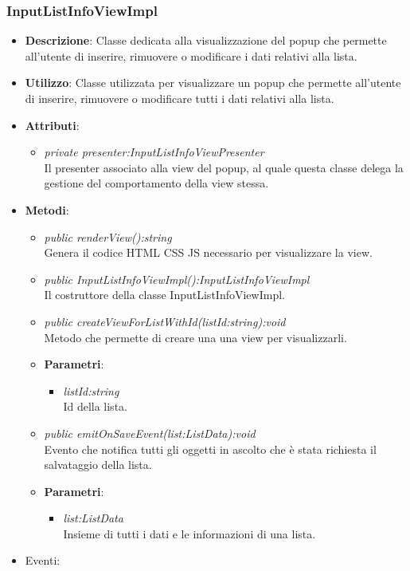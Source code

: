 \subsubsection{InputListInfoViewImpl}
\begin{itemize}
\item \textbf{Descrizione}: Classe dedicata alla visualizzazione del popup che permette all'utente di inserire, rimuovere o modificare i dati relativi alla lista.
\item \textbf{Utilizzo}: Classe utilizzata per visualizzare un popup che permette all'utente di inserire, rimuovere o modificare tutti i dati relativi alla lista.
\item \textbf{Attributi}: 
	\begin{itemize}
	\item \textit{private presenter:InputListInfoViewPresenter}\\
		Il presenter associato alla view del popup, al quale questa classe delega la gestione del comportamento della view stessa.
	\end{itemize}
\item \textbf{Metodi}:
	\begin{itemize}	
	\item \textit{public renderView():string}\\
			Genera il codice HTML CSS JS necessario per visualizzare la view.
	\item \textit{public InputListInfoViewImpl():InputListInfoViewImpl}\\
	Il costruttore della classe InputListInfoViewImpl.
	\item \textit{public createViewForListWithId(listId:string):void}\\
		Metodo che permette di creare una una view per visualizzarli.
			\item{\textbf{Parametri}: \begin{itemize}
			\item \textit{listId:string}\\
			Id della lista.
			\end{itemize}}
	\item \textit{public emitOnSaveEvent(list:ListData):void}\\
	Evento che notifica tutti gli oggetti in ascolto che è stata richiesta il salvataggio della lista.
			\item{\textbf{Parametri}: \begin{itemize}
			\item \textit{list:ListData}\\
				Insieme di tutti i dati e le informazioni di una lista.
			\end{itemize}}
	\end{itemize}
\item{Eventi}:
\end{itemize}

